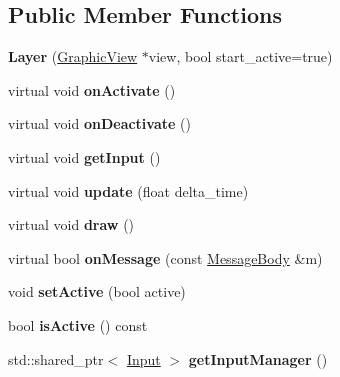 \subsection*{Public Member Functions}
\begin{DoxyCompactItemize}
\item 
\mbox{\label{classTarbora_1_1Layer_a58106508db0aafaec0d5e9bbcf79e24f}} 
{\bfseries Layer} (\hyperlink{classTarbora_1_1GraphicView}{Graphic\+View} $\ast$view, bool start\+\_\+active=true)
\item 
\mbox{\label{classTarbora_1_1Layer_aab6d82e0e2048dc50be2dc3d545c0e7f}} 
virtual void {\bfseries on\+Activate} ()
\item 
\mbox{\label{classTarbora_1_1Layer_aaa4c828f3c6fb7ff42e5667805f650c0}} 
virtual void {\bfseries on\+Deactivate} ()
\item 
\mbox{\label{classTarbora_1_1Layer_a6f06c6331635d6f29b6b711fecafc617}} 
virtual void {\bfseries get\+Input} ()
\item 
\mbox{\label{classTarbora_1_1Layer_aa840eefc7b9a7fc08f6ca7ba14e219de}} 
virtual void {\bfseries update} (float delta\+\_\+time)
\item 
\mbox{\label{classTarbora_1_1Layer_a0744dccca287ad0100f688eba65c9d3f}} 
virtual void {\bfseries draw} ()
\item 
\mbox{\label{classTarbora_1_1Layer_a246f85b37366ddf34b446331fe7a3447}} 
virtual bool {\bfseries on\+Message} (const \hyperlink{classTarbora_1_1MessageBody}{Message\+Body} \&m)
\item 
\mbox{\label{classTarbora_1_1Layer_a4fc2a9f5064bbd6776bd1ae8398aa734}} 
void {\bfseries set\+Active} (bool active)
\item 
\mbox{\label{classTarbora_1_1Layer_a606bb2b75b38acf75e5f4caabceedb97}} 
bool {\bfseries is\+Active} () const
\item 
\mbox{\label{classTarbora_1_1Layer_a6f787d1153bdbaf8066e2745d2faf86a}} 
std\+::shared\+\_\+ptr$<$ \hyperlink{classTarbora_1_1Input}{Input} $>$ {\bfseries get\+Input\+Manager} ()
\end{DoxyCompactItemize}
